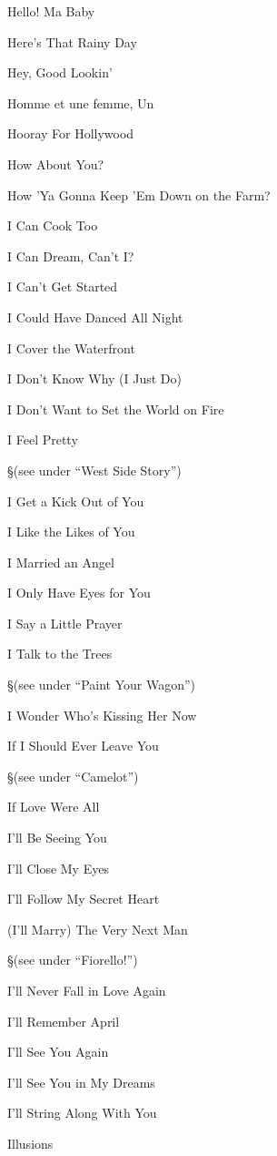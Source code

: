 \N Hello! Ma Baby


\N Here's That Rainy Day


\N Hey, Good Lookin'


\N Homme et une femme, Un


\N Hooray For Hollywood


\N How About You?


\N How 'Ya Gonna Keep 'Em Down on the Farm?


\N I Can Cook Too


\N I Can Dream, Can't I?


\N I Can't Get Started


\N I Could Have Danced All Night


\N I Cover the Waterfront


\N I Don't Know Why (I Just Do)


\N I Don't Want to Set the World on Fire


\N I Feel Pretty

\nobreak
\S (see under ``West Side Story'')

\N I Get a Kick Out of You


\N I Like the Likes of You


\N I Married an Angel


\N I Only Have Eyes for You


\N I Say a Little Prayer


\N I Talk to the Trees

\nobreak
\S (see under ``Paint Your Wagon'')

\N I Wonder Who's Kissing Her Now


\N If I Should Ever Leave You

\nobreak
\S (see under ``Camelot'')

\N If Love Were All


\N I'll Be Seeing You


\N I'll Close My Eyes


\N I'll Follow My Secret Heart


\N (I'll Marry) The Very Next Man

\nobreak
\S (see under ``Fiorello!'')

\N I'll Never Fall in Love Again


\N I'll Remember April


\N I'll See You Again


\N I'll See You in My Dreams


\N I'll String Along With You


\N Illusions


